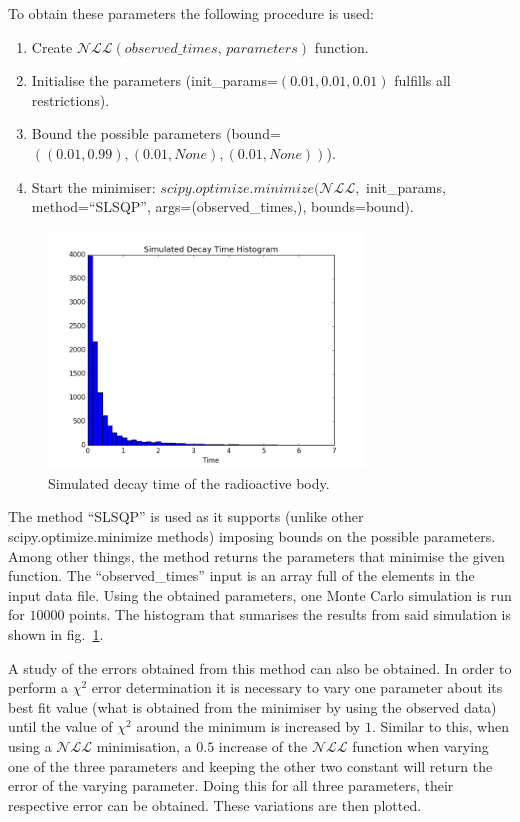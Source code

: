 \documentclass[a4paper,12pt]{article}
\begin{document}
To obtain these parameters the following procedure is used: 

\begin{enumerate}
 \item Create $\mathcal{NLL}(observed\_times,\,parameters)$ function.
 \item Initialise the parameters (init\_params=$(0.01, 0.01, 0.01)$ fulfills all restrictions).
 \item Bound the possible parameters (bound=$((0.01, 0.99), (0.01, None), (0.01, None))$).
 \item Start the minimiser: $scipy.optimize.minimize(\mathcal{NLL},$ init\_params, method=``SLSQP'', args=(observed\_times,), bounds=bound).
\end{enumerate}

\begin{figure}[h!]
\centering
\includegraphics[width=0.75\textwidth]{img/simulated_time}
\caption{Simulated decay time of the radioactive body.}
\label{fig.2}
\end{figure}

The method ``SLSQP'' is used as it supports (unlike other scipy.optimize.minimize methods) imposing bounds on the possible parameters. Among other things, the method returns the parameters that minimise the given function. The ``observed\_times'' input is an array full of the elements in the input data file. Using the obtained parameters, one Monte Carlo simulation is run for $10000$ points. The histogram that sumarises the results from said simulation is shown in fig.~\ref{fig.2}.

A study of the errors obtained from this method can also be obtained. In order to perform a $\chi^2$ error determination it is necessary to vary one parameter about its best fit value (what is obtained from the minimiser by using the observed data) until the value of $\chi^2$ around the minimum is increased by $1$. Similar to this, when using a $\mathcal{NLL}$ minimisation, a $0.5$ increase of the $\mathcal{NLL}$ function when varying one of the three parameters and keeping the other two constant will return the error of the varying parameter. Doing this for all three parameters, their respective error can be obtained. These variations are then plotted. 
\end{document}
